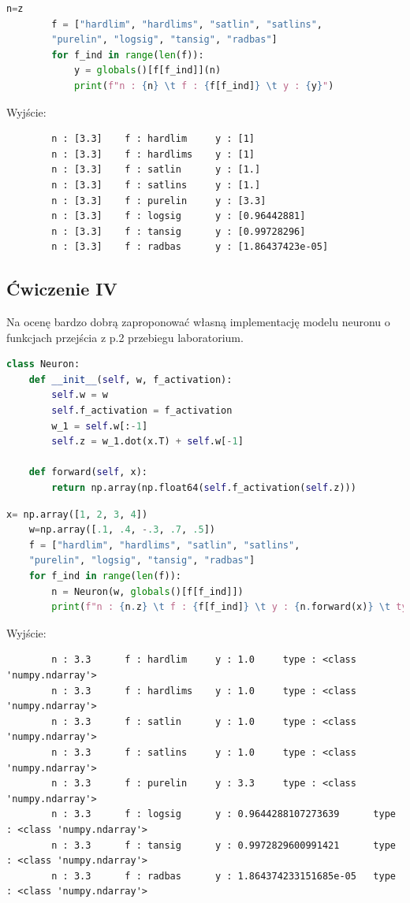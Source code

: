 \documentclass[12pt,twoside]{article}
\begin{document}
	\begin{lstlisting}[language=Python,caption=Wyznacznei aktywności neuronu o różnych funkcjah aktywacji ,label={KodPerl1}]
		n=z
		f = ["hardlim", "hardlims", "satlin", "satlins",
		"purelin", "logsig", "tansig", "radbas"]
		for f_ind in range(len(f)):
			y = globals()[f[f_ind]](n)
			print(f"n : {n} \t f : {f[f_ind]} \t y : {y}")
	\end{lstlisting}
Wyjście:
	\begin{verbatim}
		n : [3.3] 	 f : hardlim 	 y : [1]
		n : [3.3] 	 f : hardlims 	 y : [1]
		n : [3.3] 	 f : satlin 	 y : [1.]
		n : [3.3] 	 f : satlins 	 y : [1.]
		n : [3.3] 	 f : purelin 	 y : [3.3]
		n : [3.3] 	 f : logsig 	 y : [0.96442881]
		n : [3.3] 	 f : tansig 	 y : [0.99728296]
		n : [3.3] 	 f : radbas 	 y : [1.86437423e-05]
	\end{verbatim}

\subsection{Ćwiczenie IV}
Na ocenę bardzo dobrą zaproponować własną implementację modelu neuronu o funkcjach
przejścia z p.2 przebiegu laboratorium.


\begin{lstlisting}[language=Python,caption=Wyznacznei aktywności neuronu o różnych funkcjah aktywacji ,label={KodPerl1}]
	class Neuron:
    def __init__(self, w, f_activation):
        self.w = w
        self.f_activation = f_activation
        w_1 = self.w[:-1]
        self.z = w_1.dot(x.T) + self.w[-1]
        
    def forward(self, x):
        return np.array(np.float64(self.f_activation(self.z)))
\end{lstlisting}

\begin{lstlisting}[language=Python,caption=Wyznacznei aktywności neuronu o różnych funkcjah aktywacji ,label={KodPerl1}]
	x= np.array([1, 2, 3, 4])   
	w=np.array([.1, .4, -.3, .7, .5])
	f = ["hardlim", "hardlims", "satlin", "satlins",
	"purelin", "logsig", "tansig", "radbas"]
	for f_ind in range(len(f)):
		n = Neuron(w, globals()[f[f_ind]])
		print(f"n : {n.z} \t f : {f[f_ind]} \t y : {n.forward(x)} \t type : {type(n.forward(x))}")
\end{lstlisting}
Wyjście:
	\begin{verbatim}
		n : 3.3 	 f : hardlim 	 y : 1.0 	 type : <class 'numpy.ndarray'>
		n : 3.3 	 f : hardlims 	 y : 1.0 	 type : <class 'numpy.ndarray'>
		n : 3.3 	 f : satlin 	 y : 1.0 	 type : <class 'numpy.ndarray'>
		n : 3.3 	 f : satlins 	 y : 1.0 	 type : <class 'numpy.ndarray'>
		n : 3.3 	 f : purelin 	 y : 3.3 	 type : <class 'numpy.ndarray'>
		n : 3.3 	 f : logsig 	 y : 0.9644288107273639 	 type : <class 'numpy.ndarray'>
		n : 3.3 	 f : tansig 	 y : 0.9972829600991421 	 type : <class 'numpy.ndarray'>
		n : 3.3 	 f : radbas 	 y : 1.864374233151685e-05 	 type : <class 'numpy.ndarray'>
	\end{verbatim}
\end{document}
